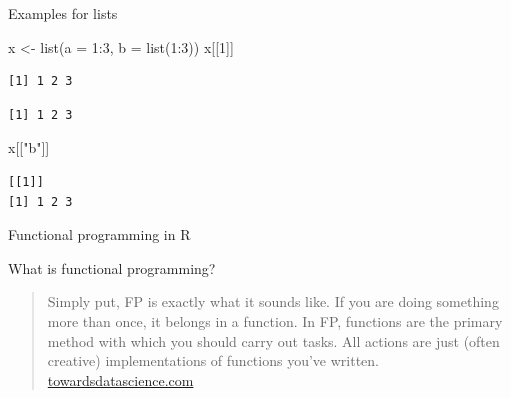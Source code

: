 \documentclass[ignorenonframetext,,t]{beamer}
\newenvironment{Shaded}{\begin{snugshade}}{\end{snugshade}}
\newcommand{\AttributeTok}[1]{\textcolor[rgb]{0.77,0.63,0.00}{#1}}
\newcommand{\DecValTok}[1]{\textcolor[rgb]{0.00,0.00,0.81}{#1}}
\newcommand{\FunctionTok}[1]{\textcolor[rgb]{0.00,0.00,0.00}{#1}}
\newcommand{\NormalTok}[1]{#1}
\newcommand{\OtherTok}[1]{\textcolor[rgb]{0.56,0.35,0.01}{#1}}
\newcommand{\SpecialCharTok}[1]{\textcolor[rgb]{0.00,0.00,0.00}{#1}}
\newcommand{\StringTok}[1]{\textcolor[rgb]{0.31,0.60,0.02}{#1}}
\begin{document}
\begin{frame}[fragile]
\begin{block}{Examples for lists}
\protect\hypertarget{examples-for-lists}{}
\begin{Shaded}
\begin{Highlighting}[]
\NormalTok{x }\OtherTok{\textless{}{-}} \FunctionTok{list}\NormalTok{(}\AttributeTok{a =} \DecValTok{1}\SpecialCharTok{:}\DecValTok{3}\NormalTok{, }\AttributeTok{b =} \FunctionTok{list}\NormalTok{(}\DecValTok{1}\SpecialCharTok{:}\DecValTok{3}\NormalTok{))}
\NormalTok{x[[}\DecValTok{1}\NormalTok{]]}
\end{Highlighting}
\end{Shaded}

\begin{verbatim}
[1] 1 2 3
\end{verbatim}

\begin{Shaded}
\end{Shaded}

\begin{verbatim}
[1] 1 2 3
\end{verbatim}

\begin{Shaded}
\begin{Highlighting}[]
\NormalTok{x[[}\StringTok{"b"}\NormalTok{]]}
\end{Highlighting}
\end{Shaded}

\begin{verbatim}
[[1]]
[1] 1 2 3
\end{verbatim}
\end{block}
\end{frame}

\begin{frame}{Functional programming in R}
\protect\hypertarget{functional-programming-in-r}{}
\begin{block}{What is functional programming?}
\protect\hypertarget{what-is-functional-programming}{}
\begin{quote}
Simply put, FP is exactly what it sounds like. If you are doing
something more than once, it belongs in a function. In FP, functions are
the primary method with which you should carry out tasks. All actions
are just (often creative) implementations of functions you've written.
\href{https://towardsdatascience.com/cleaner-r-code-with-functional-programming-adc37931ef7a}{towardsdatascience.com}
\end{quote}
\end{block}
\end{frame}
\end{document}
